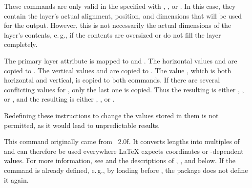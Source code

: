 \begin{Declaration}
\end{Declaration}
These commands are only valid in the  specified with
, , or . In this
case, they contain the layer's actual alignment, position, and dimensions that
will be used for the output. However, this is not necessarily the actual
dimensions of the layer's contents, e.\,g., if the contents are oversized or
do not fill the layer completely.

The primary layer attribute  is mapped to
 and
. The horizontal values  and  are
copied to . The vertical values  and 
are copied to . The value , which is both 
horizontal and vertical, is copied to both commands. If there are several
conflicting values for , only the last one is copied. Thus the
resulting  is either , , or ,
and the resulting  is either , , or
.

Redefining these instructions to change the values stored
in them is not permitted, as it would lead to unpredictable results.%
\EndIndexGroup


\begin{Declaration}
\end{Declaration}
This command originally came from
~2.0f. It converts lengths into
multiples of  and can therefore be used everywhere \LaTeX{}
expects  coordinates or -dependent
values. For more information, see \cite{package:eso-pic} and the descriptions
of , , and  below. If the command is 
already defined, e.\,g., by loading  before
, the package does not define it again.%
\iffalse%
\par
It should be noted at this point that using package
\Package{picture}\IndexPackage{picture}\textnote{\Package{picture}} (see
\cite{package:picture}) supersedes \Macro{LenToUnit} more or less. The package
extends environment \Environment{picture} and the picture commands so that you
can use \LaTeX{} lengths directly for coordinates.%
\fi
\EndIndexGroup


